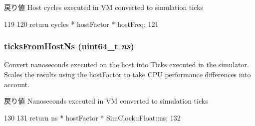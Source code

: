 \begin{DoxyReturn}{戻り値}
Host cycles executed in VM converted to simulation ticks 
\end{DoxyReturn}



\begin{DoxyCode}
119                                               {
120         return cycles * hostFactor * hostFreq;
121     }
\end{DoxyCode}
\hypertarget{classBaseKvmTimer_a4702535d08d1d648d5a5bcd113edc395}{
\subsubsection[{ticksFromHostNs}]{ ticksFromHostNs (uint64\_\-t {\em ns})}}
\label{classBaseKvmTimer_a4702535d08d1d648d5a5bcd113edc395}
Convert nanoseconds executed on the host into Ticks executed in the simulator. Scales the results using the hostFactor to take CPU performance differences into account.

\begin{DoxyReturn}{戻り値}
Nanoseconds executed in VM converted to simulation ticks 
\end{DoxyReturn}



\begin{DoxyCode}
130                                       {
131         return ns * hostFactor * SimClock::Float::ns;
132     }
\end{DoxyCode}


